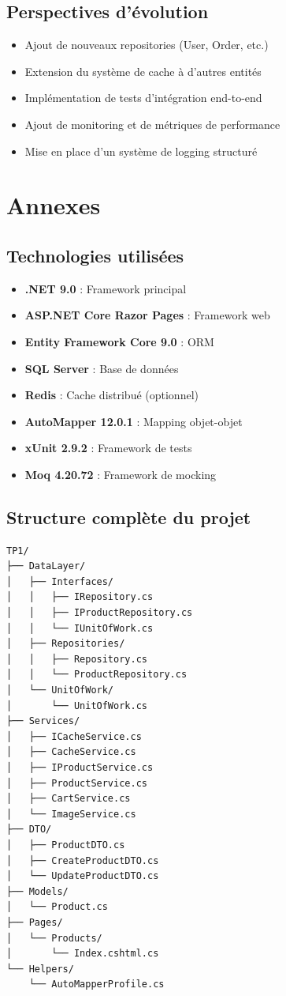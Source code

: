 \documentclass[12pt,a4paper]{article}
\begin{document}
\subsection{Perspectives d'évolution}

\begin{itemize}
    \item Ajout de nouveaux repositories (User, Order, etc.)
    \item Extension du système de cache à d'autres entités
    \item Implémentation de tests d'intégration end-to-end
    \item Ajout de monitoring et de métriques de performance
    \item Mise en place d'un système de logging structuré
\end{itemize}

\section{Annexes}

\subsection{Technologies utilisées}

\begin{itemize}
    \item \textbf{.NET 9.0} : Framework principal
    \item \textbf{ASP.NET Core Razor Pages} : Framework web
    \item \textbf{Entity Framework Core 9.0} : ORM
    \item \textbf{SQL Server} : Base de données
    \item \textbf{Redis} : Cache distribué (optionnel)
    \item \textbf{AutoMapper 12.0.1} : Mapping objet-objet
    \item \textbf{xUnit 2.9.2} : Framework de tests
    \item \textbf{Moq 4.20.72} : Framework de mocking
\end{itemize}

\subsection{Structure complète du projet}

\begin{lstlisting}[language=bash, caption=Structure détaillée, float=h!]
TP1/
├── DataLayer/
│   ├── Interfaces/
│   │   ├── IRepository.cs
│   │   ├── IProductRepository.cs
│   │   └── IUnitOfWork.cs
│   ├── Repositories/
│   │   ├── Repository.cs
│   │   └── ProductRepository.cs
│   └── UnitOfWork/
│       └── UnitOfWork.cs
├── Services/
│   ├── ICacheService.cs
│   ├── CacheService.cs
│   ├── IProductService.cs
│   ├── ProductService.cs
│   ├── CartService.cs
│   └── ImageService.cs
├── DTO/
│   ├── ProductDTO.cs
│   ├── CreateProductDTO.cs
│   └── UpdateProductDTO.cs
├── Models/
│   └── Product.cs
├── Pages/
│   └── Products/
│       └── Index.cshtml.cs
└── Helpers/
    └── AutoMapperProfile.cs
\end{lstlisting}
\end{document}
